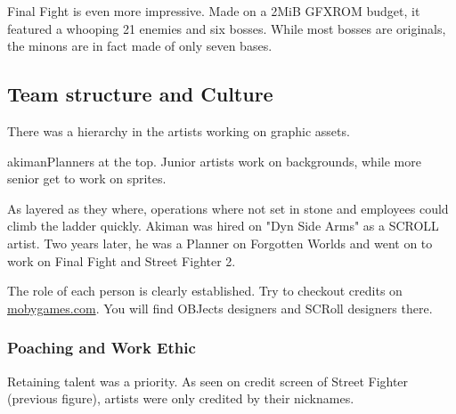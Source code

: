 Final Fight is even more impressive. Made on a 2MiB GFXROM budget, it featured a whooping 21 enemies and six bosses. While most bosses are originals, the minons are in fact made of only seven bases.

\begin{minipage}[t]{0.29\linewidth}
\end{minipage}
\hfill%
\begin{minipage}[t]{0.29\linewidth}
\end{minipage}
\hfill%
\begin{minipage}[t]{0.29\linewidth}
\end{minipage}




\pagebreak

\subsection{Team structure and Culture}

There was a hierarchy in the artists working on graphic assets. 

\begin{q}{akiman\cite{akiman2003}}Planners at the top. Junior artists work on backgrounds, while more senior get to work on sprites.
\end{q}

As layered as they where, operations where not set in stone and employees could climb the ladder quickly. Akiman was hired on "Dyn Side Arms" as a SCROLL artist. Two years later, he was a Planner on Forgotten Worlds and went on to work on Final Fight and Street Fighter 2.


\begin{trivia}
The role of each person is clearly established. Try to checkout credits on \url{mobygames.com}. You will find OBJects designers and SCRoll designers there.
\end{trivia}


\subsubsection{Poaching and Work Ethic}
Retaining talent was a priority. As seen on credit screen of Street Fighter (previous figure), artists were only credited by their nicknames.

